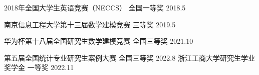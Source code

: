 



\begin{cvhonors}

  \cvhonor
    {2018年全国大学生英语竞赛（NECCS）} %
    {} %
    {全国一等奖} %
    {2018.5} %

  \cvhonor
    {南京信息工程大学第十三届数学建模竞赛} %
    {} %
    {三等奖} %
    {2019.5} %

\cvhonor
  {华为杯第十八届全国研究生数学建模竞赛} %
  {} %
  {全国三等奖} %
  {2021.10} %


  \cvhonor
    {第五届全国统计专业研究生案例大赛} %
    {} %
    {全国三等奖} %
    {2022.8} %
\cvhonor
  {浙江工商大学研究生学业奖学金} %
  {} %
  {一等奖} %
  {2022.11} %



\end{cvhonors}




